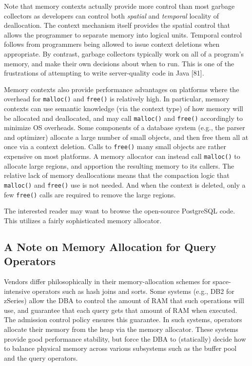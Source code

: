 \documentclass[a4paper,11pt,twoside,openright]{book}
\begin{document}
Note that memory contexts actually provide more control than most
garbage collectors as developers can control both \emph{spatial} and
\emph{temporal} locality of deallocation. The context mechanism itself
provides the spatial control that allows the programmer to separate
memory into logical units. Temporal control follows from programmers
being allowed to issue context deletions when appropriate. By contrast,
garbage collectors typically work on all of a program's memory, and
make their own decisions about when to run. This is one of the
frustrations of attempting to write server-quality code in Java
{[}81{]}.

Memory contexts also provide performance advantages on platforms where
the overhead for \texttt{malloc()} and \texttt{free()} is relatively high. In particular,
memory contexts can use semantic knowledge (via the context type) of how
memory will be allocated and deallocated, and may call \texttt{malloc()} and
\texttt{free()} accordingly to minimize OS overheads. Some components of a
database system (e.g., the parser and optimizer) allocate a large number
of small objects, and then free them all at once via a context deletion.
Calls to \texttt{free()} many small objects are rather expensive on most
platforms. A memory allocator can instead call \texttt{malloc()} to allocate
large regions, and apportion the resulting memory to its callers. The
relative lack of memory deallocations means that the compaction logic
that \texttt{malloc()} and \texttt{free()} use is not needed. And when the context is
deleted, only a few \texttt{free()} calls are required to remove the large
regions.

The interested reader may want to browse the open-source PostgreSQL
code. This utilizes a fairly sophisticated memory allocator.

\hypertarget{a-note-on-memory-allocation-for-query-operators}{%
\subsection{A Note on Memory Allocation for Query
Operators}\label{a-note-on-memory-allocation-for-query-operators}}

Vendors differ philosophically in their memory-allocation schemes for
space-intensive operators such as hash joins and sorts. Some systems
(e.g., DB2 for zSeries) allow the DBA to control the amount of RAM that
such operations will use, and guarantee that each query gets that amount
of RAM when executed. The admission control policy ensures this
guarantee. In such systems, operators allocate their memory from the
heap via the memory allocator. These systems provide good performance
stability, but force the DBA to (statically) decide how to balance
physical memory across various subsystems such as the buffer pool and
the query operators.
\end{document}
